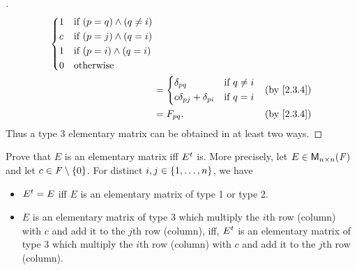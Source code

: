 \begin{proof}[]
\begin{align*}
\begin{dcases}
                                                      1 & \text{if } (p = q) \land (q \neq i) \\
                                                      c & \text{if } (p = j) \land (q = i)    \\
                                                      1 & \text{if } (p = i) \land (q = i)    \\
                                                      0 & \text{otherwise}
                                                    \end{dcases}                                            \\
                                                & = \begin{dcases}
                                                      \delta_{p q}                  & \text{if } q \neq i \\
                                                      c \delta_{p j} + \delta_{p i} & \text{if } q = i
                                                    \end{dcases} &  & \text{(by \cref{2.3.4})}                                \\
                                                & = F_{p q}.                                             &  & \text{(by \cref{2.3.4})}
  \end{align*}
  Thus a type 3 elementary matrix can be obtained in at least two ways.
\end{proof}

\begin{ex}\label{ex:3.1.5}
  Prove that \(E\) is an elementary matrix iff \({E}^{t}\) is.
  More precisely, let \(E \in \mathsf{M}_{{n} \times n}({\mathit{F}})\) and let \(c \in \mathit{F} \setminus \left\lbrace0\right\rbrace\).
  For distinct \(i, j \in \left\lbrace1, \dots, n\right\rbrace\), we have
  \begin{itemize}
    \item \({E}^{t} = E\) iff \(E\) is an elementary matrix of type 1 or type 2.
    \item \(E\) is an elementary matrix of type 3 which multiply the \(i\)th row (column) with \(c\) and add it to the \(j\)th row (column), iff, \({E}^{t}\) is an elementary matrix of type 3 which multiply the \(i\)th row (column) with \(c\) and add it to the \(j\)th row (column).
  \end{itemize}
\end{ex}

